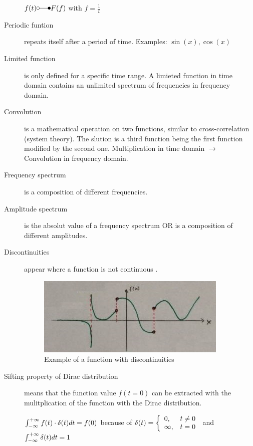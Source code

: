 \begin{description}
	$f(t) \laplace F(f)$ with $f=\frac{1}{t}$
	
	\item[Periodic funtion] repeats itself after a period of time. Examples: $\sin(x),\cos(x)$
	\item[Limited function] is only defined for a specific time range. A limieted function in time domain contains an unlimited spectrum of frequencies in frequency domain. 
	\item[Convolution] is a mathematical operation on two functions, similar to cross-correlation (system theory). The slution is a third function being the first function modified by the second one. Multiplication in time domain $\rightarrow$ Convolution in frequency domain.
	\item[Frequency spectrum] is a composition of different frequencies.
	\item[Amplitude spectrum] is the absolut value of a frequency spectrum OR is a composition of different amplitudes.
	\item[Discontinuities] appear where a function is not continuous .
		\begin{figure}
			\centering
			\includegraphics[width=0.7\linewidth]{images_LA/discontinu}
			\caption{Example of a function with discontinuities}
			\label{fig:discontinu}
		\end{figure}
	

	\item[Sifting property of Dirac distribution] means that the function value $f(t=0)$ can be extracted with the mulitplication of the function with the Dirac distribution.
	
	
	$\int_{-\infty}^{+\infty} f(t) \cdot \delta(t) dt = f(0) $ because of 
	$ \delta(t)=\left\{\begin{array}{ll} 0,&t \neq 0 \\
	\infty,&t = 0\end{array}\right. $	and $\int_{-\infty}^{+\infty}\delta(t) dt = 1 $
	

\end{description}
